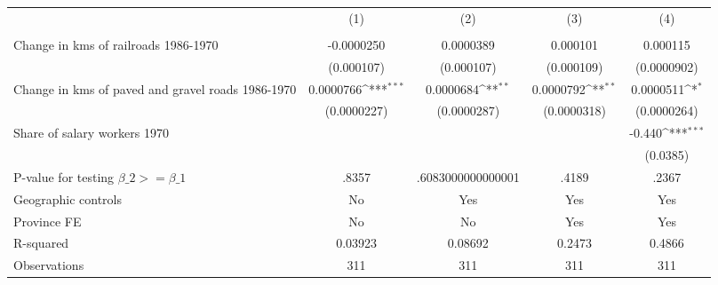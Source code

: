 {
\def\sym#1{\ifmmode^{#1}\else\(^{#1}\)\fi}
\begin{tabular}{l*{4}{c}}
\hline\hline
                &\multicolumn{1}{c}{(1)}&\multicolumn{1}{c}{(2)}&\multicolumn{1}{c}{(3)}&\multicolumn{1}{c}{(4)}\\
                &\multicolumn{1}{c}{}&\multicolumn{1}{c}{}&\multicolumn{1}{c}{}&\multicolumn{1}{c}{}\\
\hline
Change in kms of railroads 1986-1970&-0.0000250         &0.0000389         & 0.000101         & 0.000115         \\
                &(0.000107)         &(0.000107)         &(0.000109)         &(0.0000902)         \\
[1em]
Change in kms of paved and gravel roads 1986-1970&0.0000766\sym{***}&0.0000684\sym{**} &0.0000792\sym{**} &0.0000511\sym{*}  \\
                &(0.0000227)         &(0.0000287)         &(0.0000318)         &(0.0000264)         \\
[1em]
Share of salary workers 1970&                  &                  &                  &   -0.440\sym{***}\\
                &                  &                  &                  & (0.0385)         \\
\hline
P-value for testing $\beta\_{2} >= \beta\_{1}$&    .8357         &.6083000000000001         &    .4189         &    .2367         \\
Geographic controls&       No         &      Yes         &      Yes         &      Yes         \\
Province FE     &       No         &       No         &      Yes         &      Yes         \\
R-squared       &  0.03923         &  0.08692         &   0.2473         &   0.4866         \\
Observations    &      311         &      311         &      311         &      311         \\
\hline\hline
\end{tabular}
}
